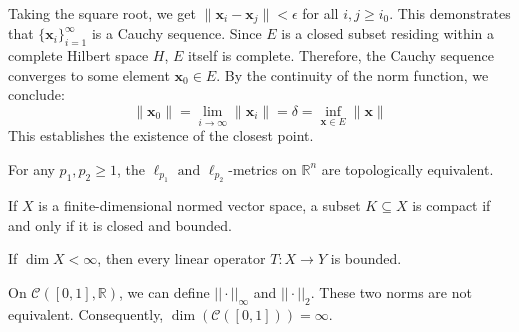 \begin{pfbox}
    Taking the square root, we get $\|\mathbf{x}_i - \mathbf{x}_j\| < \epsilon$ for all $i, j \ge i_0$. This demonstrates that $\{\mathbf{x}_i\}_{i=1}^\infty$ is a Cauchy sequence.
    Since $E$ is a closed subset residing within a complete Hilbert space $H$, $E$ itself is complete. 
    Therefore, the Cauchy sequence converges to some element $\mathbf{x}_0 \in E$. 
    By the continuity of the norm function, we conclude:
    \[ \|\mathbf{x}_0\| = \lim_{i \to \infty} \|\mathbf{x}_i\| = \delta = \inf_{\mathbf{x} \in E} \|\mathbf{x}\| \]
    This establishes the existence of the closest point.
\end{pfbox}



















\begin{corollary}
For any $p_1, p_2 \geq 1$, the $\ell_{p_1} \text{ and } \ell_{p_2}$-metrics on $\mathbb{R}^n$ are topologically equivalent.
\end{corollary}

\begin{corollary}
If $X$ is a finite-dimensional normed vector space, a subset $K \subseteq X$ is compact if and only if it is closed and bounded.
\end{corollary}

\begin{corollary}
If $\dim X < \infty$, then every linear operator $T: X \rightarrow Y$ is bounded.
\end{corollary}

\begin{remark}
On $\mathcal{C}([0,1], \mathbb{R})$, we can define $||\cdot||_\infty$ and $||\cdot||_2$. These two norms are not equivalent. Consequently, $\dim(\mathcal{C}([0,1])) = \infty$.
\end{remark}